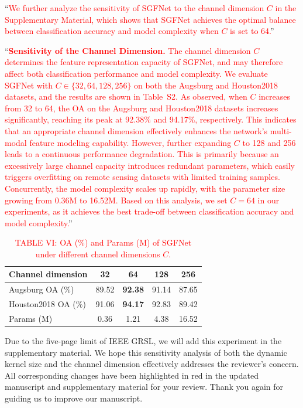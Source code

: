 ``\textcolor{red}{We further analyze the sensitivity of SGFNet to the channel dimension $C$ in the Supplementary Material, which shows that SGFNet achieves the optimal balance between classification accuracy and model complexity when $C$ is set to 64.}''

``\textbf{\textcolor{red}{Sensitivity of the Channel Dimension.}} \textcolor{red}{The channel dimension $C$ determines the feature representation capacity of SGFNet, and may therefore affect both classification performance and model complexity. We evaluate SGFNet with $C \in \{32, 64, 128, 256\}$ on both the Augsburg and Houston2018 datasets, and the results are shown in Table~S2. As observed, when $C$ increases from 32 to 64, the OA on the Augsburg and Houston2018 datasets increases significantly, reaching its peak at 92.38\% and 94.17\%, respectively. This indicates that an appropriate channel dimension effectively enhances the network's multi-modal feature modeling capability. However, further expanding $C$ to 128 and 256 leads to a continuous performance degradation. This is primarily because an excessively large channel capacity introduces redundant parameters, which easily triggers overfitting on remote sensing datasets with limited training samples. Concurrently, the model complexity scales up rapidly, with the parameter size growing from 0.36M to 16.52M. Based on this analysis, we set $C=64$ in our experiments, as it achieves the best trade-off between classification accuracy and model complexity.}''

\begin{table}[h]
  \centering\footnotesize
  \caption*{\textcolor{red}{\footnotesize TABLE VI: OA (\%) and Params (M) of SGFNet under different channel dimensions $C$.}}
  \begin{tabular}{lcccc}
  \toprule
  Channel dimension & 32 & 64 & 128 & 256 \\
  \midrule
  Augsburg OA (\%)    & 89.52 & \textbf{92.38} & 91.14 & 87.65 \\
  Houston2018 OA (\%) & 91.06 & \textbf{94.17} & 92.83 & 89.42 \\
  Params (M)          & 0.36  & 1.21  & 4.38  & 16.52 \\
  \bottomrule
  \end{tabular}
\end{table}

Due to the five-page limit of IEEE GRSL, we will add this experiment in the supplementary material. We hope this sensitivity analysis of both the dynamic kernel size and the channel dimension effectively addresses the reviewer's concern. All corresponding changes have been highlighted in red in the updated manuscript and supplementary material for your review. Thank you again for guiding us to improve our manuscript.

